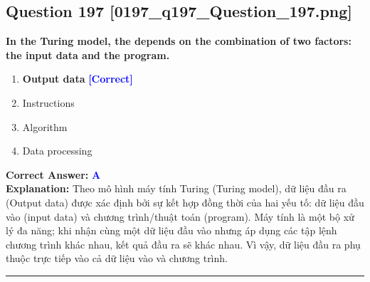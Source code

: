 \documentclass[11pt,a4paper]{article}
\begin{document}
\begin{minipage}{\textwidth}
\subsection*{Question 197 \quad \footnotesize{[0197\_q197\_Question\_197.png]}}
\noindent \textbf{In the Turing model, the depends on the combination of two factors: the input data and the program.}

\begin{enumerate}[label=\Alph*.]
    \item \textbf{Output data} \hfill \textcolor{blue}{\textbf{[Correct]}}
    \item Instructions
    \item Algorithm
    \item Data processing
\end{enumerate}

\noindent \textbf{Correct Answer:} \textcolor{blue}{\textbf{A}} \\[2pt]
\noindent \textbf{Explanation:} Theo mô hình máy tính Turing (Turing model), dữ liệu đầu ra (Output data) được xác định bởi sự kết hợp đồng thời của hai yếu tố: dữ liệu đầu vào (input data) và chương trình/thuật toán (program). Máy tính là một bộ xử lý đa năng; khi nhận cùng một dữ liệu đầu vào nhưng áp dụng các tập lệnh chương trình khác nhau, kết quả đầu ra sẽ khác nhau. Vì vậy, dữ liệu đầu ra phụ thuộc trực tiếp vào cả dữ liệu vào và chương trình.

\par\vspace{0.3cm}
\hrule
\vspace{0.3cm}
\end{minipage}
\end{document}
